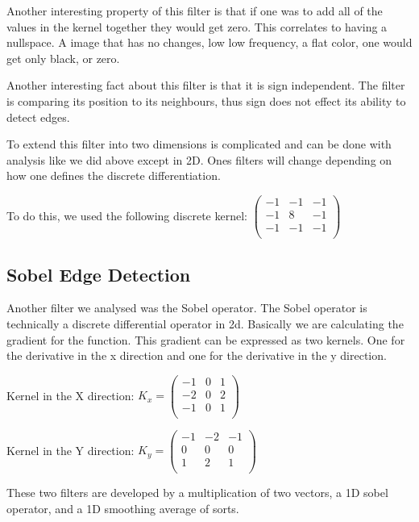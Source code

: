 \documentclass[11pt]{article}
\begin{document}
Another interesting property of this filter is that if one was to add all of the values in the kernel together they would get zero. This correlates to having a nullspace. A image that has no changes, low low frequency, a flat color, one would get only black, or zero.

Another interesting fact about this filter is that it is sign independent. The filter is comparing its position to its neighbours, thus sign does not effect its ability to detect edges.  
 
To extend this filter into two dimensions is complicated and can be done with analysis like we did above except in 2D. Ones filters will change depending on how one defines the discrete differentiation.

To do this, we used the following discrete kernel:
$\begin{pmatrix}
	-1 & -1 & -1\\
	-1 & 8 & -1\\
	-1 & -1 & -1\\
\end{pmatrix}$


\subsection{Sobel Edge Detection}
Another filter we analysed was the Sobel operator. The Sobel operator is technically a discrete differential operator in 2d. Basically we are calculating the gradient for the function. This gradient can be expressed as two kernels. One for the derivative in the x direction and one for the derivative in the y direction.

Kernel in the X direction:
$K_x = \begin{pmatrix}
	-1 & 0 & 1\\
	-2 & 0 & 2\\
	-1 & 0 & 1\\
\end{pmatrix}$

Kernel in the Y direction:
$K_y = \begin{pmatrix}
	-1 & -2 & -1\\
	0 & 0 & 0\\
	1 & 2 & 1\\
\end{pmatrix}$

These two filters are developed by a multiplication of two vectors, a 1D sobel operator, and a 1D smoothing average of sorts. 
\end{document}
